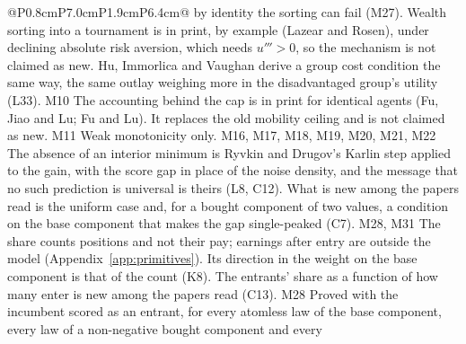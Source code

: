 \begin{longtable}{@{}P{0.8cm}P{7.0cm}P{1.9cm}P{6.4cm}@{}}
{  by identity the sorting can fail (M27). Wealth sorting into a tournament is in print, by
  example (Lazear and Rosen), under declining absolute risk aversion, which
  needs $u'''>0$, so the mechanism is not claimed as new. Hu, Immorlica and
  Vaughan derive a group cost condition the same way, the same outlay weighing
  more in the disadvantaged group's utility (L33).}
  {M10}
  {The accounting behind the cap is in print for identical agents (Fu, Jiao
  and Lu; Fu and Lu). It replaces the old mobility ceiling and is not claimed
  as new.}
  {M11}
  {Weak monotonicity only.}
  {M16, M17, M18, M19, M20, M21, M22}
  {The absence of an interior minimum is Ryvkin and Drugov's Karlin step
  applied to the gain, with the score gap in place of the noise density, and
  the message that no such prediction is universal is theirs (L8, C12). What
  is new among the papers read is the uniform case and, for a bought component
  of two values, a condition on the base component that makes the gap
  single-peaked (C7).}
  {M28, M31}
  {The share counts positions and not their pay; earnings after entry are
  outside the model (Appendix~\ref{app:primitives}). Its direction in the
  weight on the base component is that of the count (K8). The entrants' share
  as a function of how many enter is new among the papers read (C13).}
  {M28}
  {Proved with the incumbent scored as an entrant, for every atomless law of
  the base component, every law of a non-negative bought component and every
}
\end{longtable}
